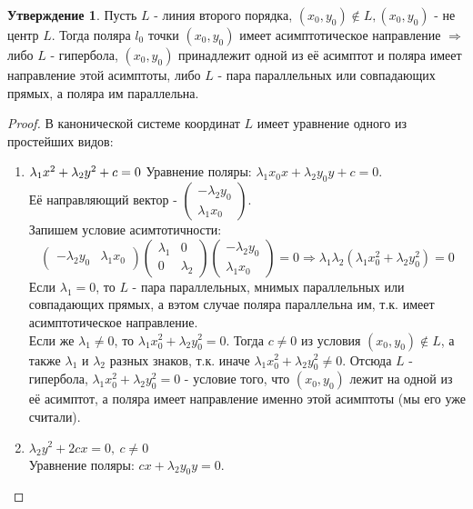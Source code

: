\documentclass[a4paper, 12pt]{article}
\theoremstyle{definition}
\newtheorem*{subtheorem}{Утверждение}
\begin{document}
	\begin{subtheorem}
		Пусть $L$ - линия второго порядка, $(x_0, y_0) \notin L, (x_0, y_0)$ - не центр $L$. Тогда поляра $l_0$ точки $(x_0, y_0)$ имеет асимптотическое направление $\Rightarrow$ либо $L$ - гипербола, $(x_0, y_0)$ принадлежит одной из её асимптот и поляра имеет направление этой асимптоты, либо $L$ - пара параллельных или совпадающих прямых, а поляра им параллельна.
	\end{subtheorem}
	\begin{proof}
		В канонической системе координат $L$ имеет уравнение одного из простейших видов:
		\begin{enumerate}
			\item $\lambda_1x^2+\lambda_2y^2 + c = 0\\$
			Уравнение поляры: $\lambda_1x_0x+\lambda_2y_0y + c = 0$.\\ Её направляющий вектор - $\begin{pmatrix} -\lambda_2y_0 \\ \lambda_1x_0 \end{pmatrix}$.\\
			Запишем условие асимтотичности: $$\begin{pmatrix} -\lambda_2y_0 & \lambda_1x_0 \end{pmatrix}\begin{pmatrix} \lambda_1&0 \\ 0&\lambda_2 \end{pmatrix}\begin{pmatrix} -\lambda_2y_0 \\ \lambda_1x_0 \end{pmatrix} = 0 \Rightarrow \lambda_1\lambda_2(\lambda_1x_0^2 + \lambda_2y_0^2) = 0$$
			Если $\lambda_1 = 0$, то $L$ - пара параллельных, мнимых параллельных или совпадающих прямых, а вэтом случае поляра параллельна им, т.к. имеет асимптотическое направление.\\
			Если же $\lambda_1 \neq 0$, то $\lambda_1x_0^2 + \lambda_2y_0^2 = 0$. Тогда $c \neq 0$ из условия $(x_0, y_0) \notin L$, а также $\lambda_1$ и $\lambda_2$ разных знаков, т.к. иначе $\lambda_1x_0^2 + \lambda_2y_0^2 \neq 0$.
			Отсюда $L$ - гипербола, $\lambda_1x_0^2 + \lambda_2y_0^2 = 0$ - условие того, что $(x_0, y_0)$ лежит на одной из её асимптот, а поляра имеет направление именно этой асимптоты (мы его уже считали).
			\item $\lambda_2y^2 + 2cx = 0, \ c \neq 0$\\
			Уравнение поляры: $cx+\lambda_2y_0y = 0$.\\

\end{enumerate}
\end{proof}
\end{document}
